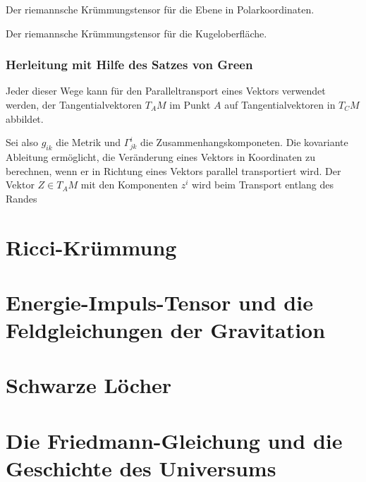 \begin{beispiel}
Der riemannsche Krümmungstensor für die Ebene in Polarkoordinaten.
\end{beispiel}

\begin{beispiel}
Der riemannsche Krümmungstensor für die Kugeloberfläche.
\end{beispiel}

\subsubsection{Herleitung mit Hilfe des Satzes von Green}
Jeder dieser Wege kann für den Paralleltransport eines Vektors
verwendet werden, der Tangentialvektoren $T_AM$ im Punkt $A$ auf
Tangentialvektoren in $T_CM$ abbildet.

Sei also $g_{ik}$ die Metrik und $\Gamma^i_{jk}$ die
Zusammenhangskomponeten.
Die kovariante Ableitung ermöglicht, die Veränderung eines Vektors in
Koordinaten zu berechnen, wenn er in Richtung eines Vektors parallel
transportiert wird.
Der Vektor $Z\in T_AM$ mit den Komponenten $z^i$ wird beim Transport
entlang des Randes 

%
%
\section{Ricci-Krümmung
\label{buch:kruemmung:section:ricci}}

%
%
\section{Energie-Impuls-Tensor und die Feldgleichungen der Gravitation
\label{buch:kruemmung:section:gravitation}}

%
%
\section{Schwarze Löcher
\label{buch:kruemmung:section:schwarzesloch}}

%
%
\section{Die Friedmann-Gleichung und die Geschichte des Universums
\label{buch:kruemmung:section:friedmann}}

